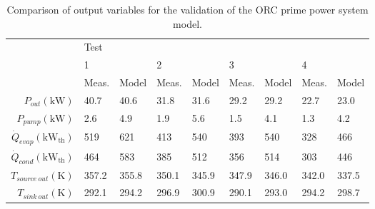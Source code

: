 \begin{table}[h]
	\centering
	\caption{Comparison of output variables for the validation of the ORC prime power system model.}
	\label{tab:verification_results01}
	\begin{tabular}{rllllllll}
		\toprule
		                                      & Test  &       &       &       &       &       &       &         \\ \cline{2-9}
		                                      & 1     &       & 2     &       & 3     &       & 4     &         \\
		                                      & Meas. & Model & Meas. & Model & Meas. & Model & Meas. & Model   \\ \midrule
		         $P_{out}(\si{\kilo\watt})$ & 40.7  & 40.6  & 31.8  & 31.6  & 29.2  & 29.2  & 22.7  & 23.0    \\
		          $P_{pump}(\si{\kilo\watt})$ & 2.6   & 4.9   & 1.9   & 5.6   & 1.5   & 4.1   & 1.3   & 4.2     \\
 $\dot{Q}_{evap}(\si{\kilo\watt}_\text{th})$ & 519   & 621   & 413   & 540   & 393   & 540   & 328   & 466     \\
 $\dot{Q}_{cond}(\si{\kilo\watt}_\text{th})$ & 464   & 583   & 385   & 512   & 356   & 514   & 303   & 446     \\
		       $T_{source\ out}(\si{\kelvin})$ & 357.2 & 355.8 & 350.1 & 345.9 & 347.9 & 346.0 & 342.0 & 337.5   \\
		         $T_{sink\ out}(\si{\kelvin})$ & 292.1 & 294.2 & 296.9 & 300.9 & 290.1 & 293.0 & 294.2 & 298.7   \\ \bottomrule
\end{tabular}
\end{table}

